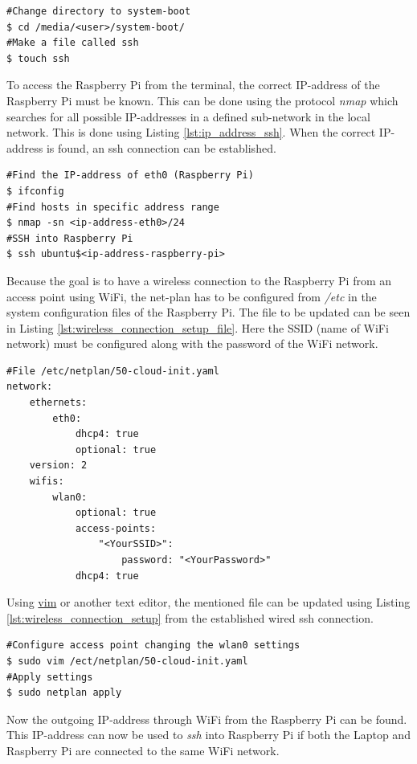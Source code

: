 \documentclass[../Head/report.tex]{subfiles}
\begin{document}
\begin{lstlisting}[frame=none,caption={How to enable ssh communication by making a file called \textit{ssh} to system-boot of the sd card}, label=lst:enable_ssh]
#Change directory to system-boot
$ cd /media/<user>/system-boot/
#Make a file called ssh
$ touch ssh
\end{lstlisting}

To access the Raspberry Pi from the terminal, the correct IP-address of the Raspberry Pi must be known. This can be done using the protocol \textit{nmap} which searches for all possible IP-addresses in a defined sub-network in the local network. This is done using Listing \ref{lst:ip_address_ssh}. When the correct IP-address is found, an ssh connection can be established. 

\begin{lstlisting}[frame=none, caption={Find the IP-address of the Raspberry Pi for \textit{ssh} communication},label=lst:ip_address_ssh]
#Find the IP-address of eth0 (Raspberry Pi) 
$ ifconfig	
#Find hosts in specific address range 
$ nmap -sn <ip-address-eth0>/24
#SSH into Raspberry Pi 
$ ssh ubuntu$<ip-address-raspberry-pi>
\end{lstlisting}

Because the goal is to have a wireless connection to the Raspberry Pi from an access point using WiFi, the net-plan has to be configured from \textit{/etc}  in the system configuration files of the Raspberry Pi. The file to be updated can be seen in Listing \ref{lst:wireless_connection_setup_file}. Here the SSID (name of WiFi network) must be configured along with the password of the WiFi network. 

\begin{lstlisting}[frame=none, caption={File to configure to enable wireless connection},label=lst:wireless_connection_setup_file]
#File /etc/netplan/50-cloud-init.yaml
network:
    ethernets:
        eth0:
            dhcp4: true
            optional: true
    version: 2
    wifis:
        wlan0:
            optional: true
            access-points:
                "<YourSSID>":
                    password: "<YourPassword>"
            dhcp4: true

\end{lstlisting}

Using \href{https://www.vim.org/}{vim} or another text editor, the mentioned file can be updated using Listing \ref{lst:wireless_connection_setup} from the established wired ssh connection.  

\begin{lstlisting}[frame=none, caption={Create an access point from a wireless connection by configuring netplan},label=lst:wireless_connection_setup]
#Configure access point changing the wlan0 settings
$ sudo vim /ect/netplan/50-cloud-init.yaml
#Apply settings  
$ sudo netplan apply
\end{lstlisting}

Now the outgoing IP-address through WiFi from the Raspberry Pi can be found. This IP-address can now be used to \textit{ssh} into Raspberry Pi if both the Laptop and Raspberry Pi are connected to the same WiFi network.
\end{document}
